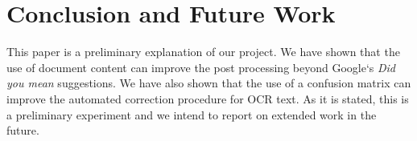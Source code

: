 \documentclass{article}
\begin{document}
\section{Conclusion and Future Work}
\label{sec:conclusion}

This paper is a preliminary explanation of our project. We have shown
that the use of document content can improve the post processing
beyond Google`s {\em Did you mean} suggestions. We have also shown
that the use of a confusion matrix can improve the automated
correction procedure for OCR text. As it is stated, this is a
preliminary experiment and we intend to report on extended work in the
future.



\end{document}
